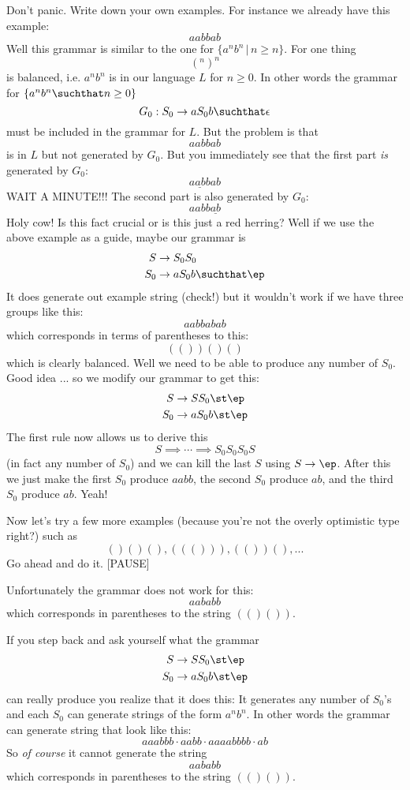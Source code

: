 \begin{eg}
Don't panic. Write down your own examples.
For instance we already have this example:
\[
aabbab
\]
Well this grammar is similar to the one for $\{a^nb^n \,|\, n \geq n\}$.
For one thing 
\[
(^n )^n
\]
is balanced, i.e. $a^nb^n$ is in our language $L$ for $n \geq 0$.
In other words the grammar for $\{a^nb^n \suchthat n \geq 0\}$
\[
G_0: S_0 \rightarrow aS_0b \suchthat \epsilon
\]
must be included in the grammar for $L$.
But the problem is that 
\[
aabbab
\]
is in $L$ but not generated by $G_0$.
But you immediately see that the first part \textit{ is} generated by $G_0$:
\[
\underline{aabb} ab
\]
WAIT A MINUTE!!!
The second part is also generated by $G_0$:
\[
aabb \underline{ab}
\]
Holy cow! 
Is this fact crucial or is this just a red herring?
Well if we use the above example as a guide, maybe our grammar is
\begin{align*}
S &\rightarrow S_0 S_0 \\
S_0 &\rightarrow a S_0 b \suchthat \ep
\end{align*}
It does generate out example string (check!)
but it wouldn't work if we have three groups like this:
\[
aabbabab
\]
which corresponds in terms of parentheses to this:
\[
(())()()
\]
which is clearly balanced.
Well we need to be able to produce any number of $S_0$.
Good idea ... so we modify our grammar to get this:
\begin{align*}
S &\rightarrow SS_0 \st \ep \\
S_0 &\rightarrow aS_0 b \st \ep
\end{align*}
The first rule now allows us to derive this
\[
S \implies \cdots \implies S_0 S_0 S_0 S
\]
(in fact any number of $S_0$) and we can kill the last $S$ using
$S \rightarrow \ep$.
After this we just make the first $S_0$ produce $aabb$, the second $S_0$
produce $ab$, and the third $S_0$ produce $ab$.
Yeah!

Now let's try a few more examples (because you're not the overly optimistic
type right?) such as
\[
()()(), ((())), (())(), ...
\]
Go ahead and do it. [PAUSE]

Unfortunately the grammar does not work for this:
\[
aababb
\]
which corresponds in parentheses to the string $(()())$.

If you step back and ask yourself what the grammar
\begin{align*}
S &\rightarrow SS_0 \st \ep \\
S_0 &\rightarrow aS_0 b \st \ep
\end{align*}
can really produce you realize that it does this:
It generates any number of $S_0$'s and each $S_0$ can generate
strings of the form $a^nb^n$.
In other words the grammar can generate string that look like this:
\[
aaabbb \cdot aabb \cdot aaaabbbb \cdot ab
\]
So \textit{ of course} it cannot generate the string
\[
aababb
\]
which corresponds in parentheses to the string $(()())$.


\end{eg}
